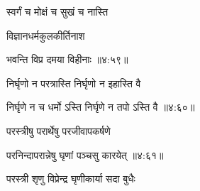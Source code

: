 \nemslokab

{\devanagarifont स्वर्गं च मोक्षं च सुखं च नास्ति  \danda\dontdisplaylinenum }%
 
\nemslokac

{\devanagarifont विज्ञानधर्मकुलकीर्तिनाश }%
  \dontdisplaylinenum    {}%



\nemslokad

{\devanagarifont भवन्ति विप्र दमया विहीनाः {॥४:५९॥} \veg\dontdisplaylinenum }%


\vers


{\devanagarifont निर्घृणो न परत्रास्ति निर्घृणो न इहास्ति वै \thinspace{\dandab} \dontdisplaylinenum }%


{\devanagarifont निर्घृणे न च धर्मो ऽस्ति निर्घृणे न तपो ऽस्ति वै {॥४:६०॥} \veg\dontdisplaylinenum }%

{\devanagarifont परस्त्रीषु परार्थेषु परजीवापकर्षणे \thinspace{\dandab} \dontdisplaylinenum }%


{\devanagarifont परनिन्दापरान्नेषु घृणां पञ्चसु कारयेत् {॥४:६१॥} \veg\dontdisplaylinenum }%

{\devanagarifont परस्त्री शृणु विप्रेन्द्र घृणीकार्या सदा बुधैः \thinspace{\dandab} \dontdisplaylinenum }%

